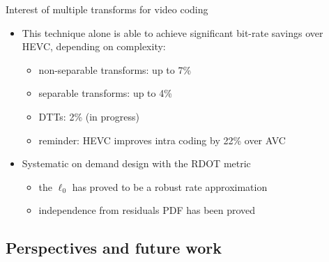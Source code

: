 \documentclass[10pt]{beamer} %
\makeatletter
\newcommand*{\currentname}{\@currentlabelname}
\makeatother
\begin{document}
\begin{frame}{\currentname}
	\begin{block}{Interest of multiple transforms for video coding}
		\begin{itemize}
			\item This technique alone is able to achieve significant bit-rate
				savings over HEVC, depending on complexity:
				\begin{itemize}
					\item non-separable transforms: up to 7\%
					\item separable transforms: up to 4\%
					\item DTTs: 2\% (in progress)
					\item reminder: HEVC improves intra coding by 22\% over
						AVC
				\end{itemize}
			\item Systematic on demand design with the RDOT metric
				\begin{itemize}
					\item the $\ell_0$ has proved to be a robust rate
						approximation
					\item independence from residuals PDF has been proved
				\end{itemize}
		\end{itemize}
	\end{block}
\end{frame}

\subsection*{Perspectives and future work}
\end{document}
